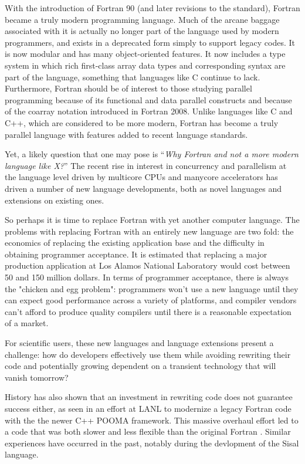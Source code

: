 With the introduction of Fortran 90 (and later revisions to the
standard), Fortran became a truly modern programming language. Much of
the arcane baggage associated with it is actually no longer part of
the language used by modern programmers, and exists in a deprecated
form simply to support legacy codes. It is now modular and has many
object-oriented features.  It now includes a type system in which rich
first-class array data types and corresponding syntax are part of the
language, something that languages like C continue to lack.
Furthermore, Fortran should be of interest to those studying parallel
programming because of its functional and data parallel constructs and
because of the coarray notation introduced in Fortran 2008. Unlike
languages like C and C++, which are considered to be more modern,
Fortran has become a truly parallel language with features added to
recent language standards.

Yet, a likely question that one may pose is ``\emph{Why Fortran and not a more
  modern language like X?}''  The recent rise in interest in concurrency and
parallelism at the language level driven by multicore CPUs and manycore
accelerators has driven a number of new language developments, both as novel
languages and extensions on existing ones.

So perhaps it is time to replace Fortran with yet another computer language.  The
problems with replacing Fortran with an entirely new language are two fold:
the economics of replacing the existing application base and the difficulty in
obtaining programmer acceptance.  It is estimated that replacing a major
production application at Los Alamos National Laboratory would cost between 50
and 150 million dollars.  In terms of programmer acceptance, there is always
the "chicken and egg problem": programmers won't use a new language until they
can expect good performance across a variety of platforms, and compiler
vendors can't afford to produce quality compilers until there is a reasonable
expectation of a market.

For scientific users, these new languages and language extensions
present a challenge: how do developers effectively use them while
avoiding rewriting their code and potentially growing dependent on a
transient technology that will vanish tomorrow?

History has also shown that an investment in rewriting code does not guarantee
success either, as seen in an effort at LANL to modernize a legacy Fortran
code with the the newer C++ POOMA framework.  This massive overhaul effort led
to a code that was both slower and less flexible than the original Fortran
\cite{}.  Similar experiences have occurred in the past, notably during the
devlopment of the Sisal language.

